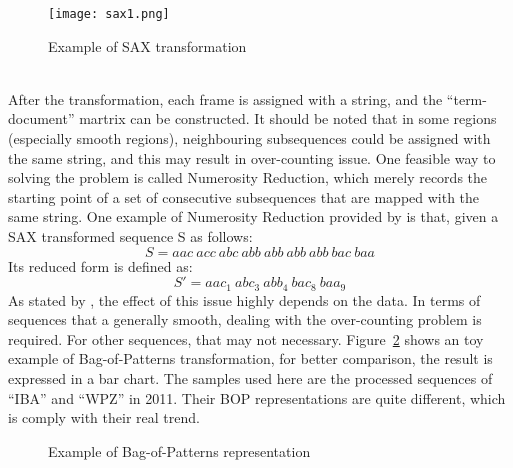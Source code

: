 \begin{figure}[!htbp]
    \centering
    \texttt{[image: sax1.png]}
    \caption{Example of SAX transformation}
    \label{fig:sax1}
\end{figure} 
\\After the transformation, each frame is assigned with a string, and the ``term-document'' martrix can be constructed. It should be noted that in some regions (especially smooth regions), neighbouring subsequences could be assigned with the same string, and this may result in over-counting issue. One feasible way to solving the problem is called Numerosity Reduction, which merely records the starting point of a set of consecutive subsequences that are mapped with the same string. One example of Numerosity Reduction provided by \cite{lin2007experiencing} is that, given a SAX transformed sequence S as follows:
\begin{equation}\nonumber
    S = aac~acc~abc~abb~abb~abb~abb~bac~baa
\end{equation}
Its reduced form is defined as:
\begin{equation}\nonumber
    S\prime = aac_1~abc_3~abb_4~bac_8~baa_9
\end{equation}
As stated by \cite{lin2012rotation}, the effect of this issue highly depends on the data. In terms of sequences that a generally smooth, dealing with the over-counting problem is required. For other sequences, that may not necessary. Figure~\ref{fig:bop1} shows an toy example of Bag-of-Patterns transformation, for better comparison, the result is expressed in a bar chart. The samples used here are the processed sequences of ``IBA'' and ``WPZ'' in 2011. Their BOP representations are quite different, which is comply with their real trend. 
\begin{figure}[!htbp]
    \centering 
    \caption{Example of Bag-of-Patterns representation} 
    \label{fig:bop1} 
\end{figure} 

